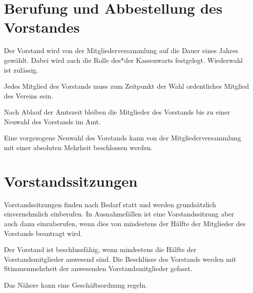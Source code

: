 \section{Berufung und Abbestellung des Vorstandes}
	\begin{myEnum}
		\item Der Vorstand wird von der Mitgliederversammlung auf die Dauer eines Jahres gewählt. Dabei wird auch die Rolle des*der Kassenwarts festgelegt. Wiederwahl ist zulässig.
		\item Jedes Mitglied des Vorstands muss zum Zeitpunkt der Wahl ordentliches Mitglied des Vereins sein. 
		\item Nach Ablauf der Amtszeit bleiben die Mitglieder des Vorstands bis zu einer Neuwahl des Vorstands im Amt.
		\item Eine vorgezogene Neuwahl des Vorstands kann von der Mitgliederversammlung mit einer absoluten Mehrheit beschlossen werden.
	\end{myEnum}
	
\section{Vorstandssitzungen}
	\begin{myEnum}
		\item Vorstandssitzungen finden nach Bedarf statt und werden grundsätzlich einvernehmlich einberufen. In Ausnahmefällen ist eine Vorstandssitzung aber auch dann einzuberufen, wenn dies von mindestens der Hälfte der Mitglieder des Vorstands beantragt wird.
		\item Der Vorstand ist beschlussfähig, wenn mindestens die Hälfte der Vorstandsmitglieder anwesend sind. Die Beschlüsse des Vorstands werden mit Stimmenmehrheit der anwesenden Vorstandsmitglieder gefasst.
		\item Das Nähere kann eine Geschäftsordnung regeln.
	\end{myEnum}